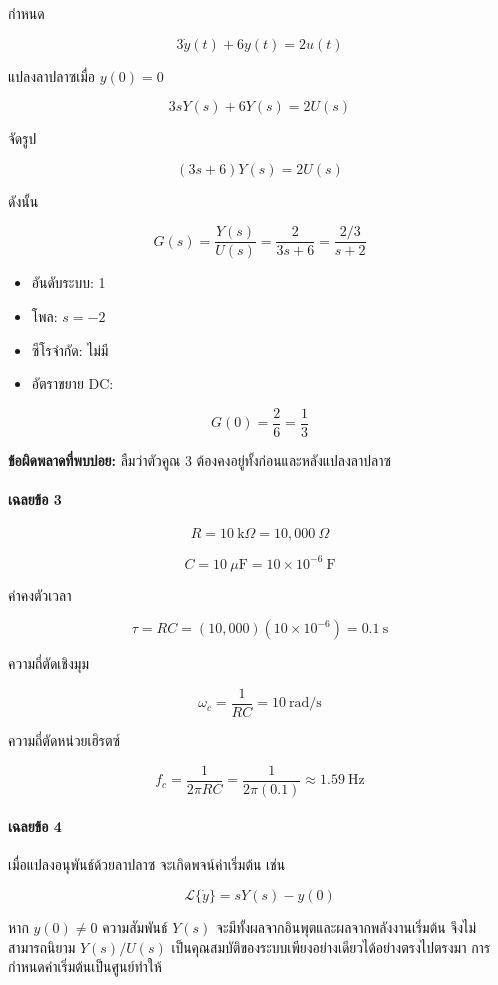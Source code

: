 กำหนด

\[
3\dot{y}(t)+6y(t)=2u(t)
\]

แปลงลาปลาซเมื่อ $y(0)=0$

\[
3sY(s)+6Y(s)=2U(s)
\]

จัดรูป

\[
(3s+6)Y(s)=2U(s)
\]

ดังนั้น

\[
\boxed{
G(s)=\frac{Y(s)}{U(s)}
=\frac{2}{3s+6}
=\frac{2/3}{s+2}
}
\]

\begin{itemize}
    \item อันดับระบบ: 1
    \item โพล: $s=-2$
    \item ซีโรจำกัด: ไม่มี
    \item อัตราขยาย DC:
\end{itemize}

\[
G(0)=\frac{2}{6}=\boxed{\frac{1}{3}}
\]

\textbf{ข้อผิดพลาดที่พบบ่อย:} ลืมว่าตัวคูณ 3 ต้องคงอยู่ทั้งก่อนและหลังแปลงลาปลาซ

\paragraph{เฉลยข้อ 3}

\[
R=10\ \text{k}\Omega=10{,}000\ \Omega
\]

\[
C=10\ \mu\text{F}=10\times10^{-6}\ \text{F}
\]

ค่าคงตัวเวลา

\[
\tau=RC
=(10{,}000)(10\times10^{-6})
=\boxed{0.1\ \text{s}}
\]

ความถี่ตัดเชิงมุม

\[
\omega_c=\frac{1}{RC}=10\ \text{rad/s}
\]

ความถี่ตัดหน่วยเฮิรตซ์

\[
f_c=\frac{1}{2\pi RC}
=\frac{1}{2\pi(0.1)}
\approx\boxed{1.59\ \text{Hz}}
\]

\paragraph{เฉลยข้อ 4}

เมื่อแปลงอนุพันธ์ด้วยลาปลาซ จะเกิดพจน์ค่าเริ่มต้น เช่น

\[
\mathcal{L}\{\dot{y}\}=sY(s)-y(0)
\]

หาก $y(0)\neq0$ ความสัมพันธ์ $Y(s)$ จะมีทั้งผลจากอินพุตและผลจากพลังงานเริ่มต้น จึงไม่สามารถนิยาม $Y(s)/U(s)$ เป็นคุณสมบัติของระบบเพียงอย่างเดียวได้อย่างตรงไปตรงมา การกำหนดค่าเริ่มต้นเป็นศูนย์ทำให้

